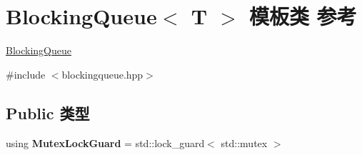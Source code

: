 \hypertarget{classBlockingQueue}{}\section{Blocking\+Queue$<$ T $>$ 模板类 参考}
\label{classBlockingQueue}


\hyperlink{classBlockingQueue}{Blocking\+Queue}  




{\ttfamily \#include $<$blockingqueue.\+hpp$>$}

\subsection*{Public 类型}
\begin{DoxyCompactItemize}
\item 
\mbox{\label{classBlockingQueue_a6b5553396530a9e0a8c6656aaf05e6b2}} 
using {\bfseries Mutex\+Lock\+Guard} = std\+::lock\+\_\+guard$<$ std\+::mutex $>$
\end{DoxyCompactItemize}

